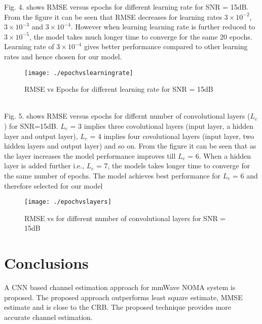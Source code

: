 \documentclass[journal]{IEEEtran}
\begin{document}
Fig. 4. shows RMSE versus epochs for different learning rate for SNR = 15dB. From the figure it can be seen that RMSE decreases for learning rates $3 \times 10^{-2}$, $3 \times 10^{-3}$ and $3 \times 10^{-4}$. However when learning learning rate is further reduced to $3 \times 10^{-5}$, the model takes much longer time to converge for the same 20 epochs. Learning rate of $3 \times 10^{-4}$ gives better performance compared to other learning rates and hence chosen for our model.
\begin{figure}[h]
	\centering
	\texttt{[image: ./epochvslearningrate]} 
	\caption{RMSE vs Epochs for different learning rate for SNR = 15dB}
\end{figure}\\
Fig. 5. shows RMSE versus epochs for differnt number of convolutional layers (${L_c}$) for SNR=15dB. ${L_c}$ = 3 implies three covolutional layers (input layer, a hidden layer and output layer), ${L_c}$ = 4 implies four covolutional layers (input layer, two hidden layers and output layer) and so on. From the figure it can be seen that as the layer increases the model performance improves till ${L_c}$ = 6. When a hidden layer is added further i.e., ${L_c}$ = 7, the models takes longer time to converge for the same number of epochs. The model achieves best performance for ${L_c}$ = 6 and therefore selected for our model
\begin{figure}[h]
	\centering
	\texttt{[image: ./epochvslayers]} 
	\caption{RMSE vs for different number of convolutional layers for SNR = 15dB}
\end{figure}

\section{Conclusions}
A CNN based channel estimation approach for mmWave NOMA system is proposed. The proposed approach outperforms least square estimate, MMSE estimate and is close to the CRB. The proposed technique provides more accurate channel estimation.\\
\end{document}
